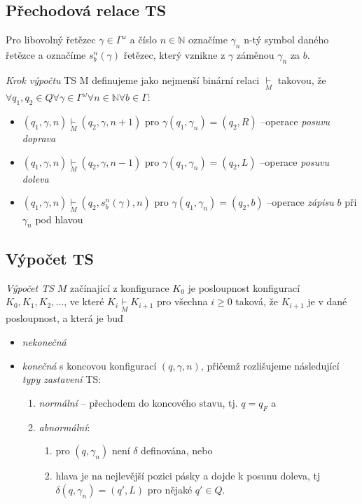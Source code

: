 \documentclass[a4paper, 11pt]{report}
\begin{document}
\subsection{Přechodová relace TS}
Pro libovolný řetězec $\gamma \in \Gamma^\omega$ a číslo $n \in \mathbb{N}$ označíme $\gamma_n$ n-tý symbol daného řetězce a označíme $s_b^n(\gamma)$ řetězec, který vznikne z $\gamma$ záměnou $\gamma_n$ za $b$.

\emph{Krok výpočtu} TS M definujeme jako nejmenší binární relaci $\underset{M}{\vdash}$ takovou, že $\forall q_1, q_2 \in Q \forall \gamma \in \Gamma^\omega \forall n \in \mathbb{N} \forall b \in \Gamma$:
\begin{itemize}
	\item $(q_1, \gamma, n) \underset{M}{\vdash} (q_2, \gamma, n+1)$ pro $\gamma(q_1, \gamma_n) = (q_2, R)$ --operace \emph{posuvu doprava}
	\item $(q_1, \gamma, n) \underset{M}{\vdash} (q_2, \gamma, n-1)$ pro $\gamma(q_1, \gamma_n) = (q_2, L)$ --operace \emph{posuvu doleva}
	\item $(q_1, \gamma, n) \underset{M}{\vdash} (q_2, s_b^n(\gamma), n)$ pro $\gamma(q_1, \gamma_n) = (q_2, b)$ --operace \emph{zápisu} $b$ při $\gamma_n$ pod hlavou
\end{itemize}

\subsection{Výpočet TS}
\emph{Výpočet TS} $M$ začínající z konfigurace $K_0$ je posloupnost konfigurací $K_0, K_1, K_2, \dots$, ve které $K_i \underset{M}{\vdash} K_{i+1}$ pro všechna $i \geq 0$ taková, že $K_{i+1}$ je v dané posloupnost, a která je buď
\begin{itemize}
	\item \emph{nekonečná}
	\item \emph{konečná} s koncovou konfigurací $(q, \gamma, n)$, přičemž rozlišujeme následující \emph{typy zastavení} TS:
	\begin{enumerate}
		\item \emph{normální} -- přechodem do koncového stavu, tj. $q = q_F$ a 
		\item \emph{abnormální}:
		\begin{enumerate}
			\item pro $(q, \gamma_n)$ není $\delta$ definována, nebo
			\item hlava je na nejlevější pozici pásky a dojde k posunu doleva, tj $\delta(q, \gamma_n) = (q', L)$ pro nějaké $q' \in Q$.
		\end{enumerate}
	\end{enumerate}
\end{itemize}
\end{document}
